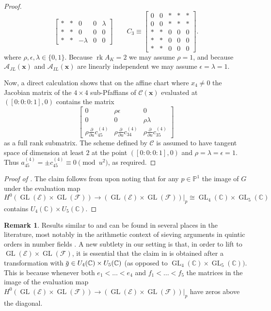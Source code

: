 \documentclass[11pt]{amsart}
\numberwithin{theorem}{section}
\numberwithin{equation}{section}
\theoremstyle{definition}\newtheorem{defn}[theorem]{Definition}
\theoremstyle{definition}\newtheorem{remark}[theorem]{Remark}
\theoremstyle{definition}\newtheorem{question}[theorem]{Question}
\theoremstyle{definition}\newtheorem{problem}[theorem]{Problem}
\newcommand{\CC}{\mathbb{C}}
\newcommand{\PP}{\mathbb{P}}
\newcommand{\cE}{\mathcal{E}}
\newcommand{\cF}{\mathcal{F}}
\newcommand{\cA}{\mathcal{A}}
\newcommand{\overbar}[1]{\mkern 1.5mu\overline{\mkern-1.5mu#1\mkern-1.5mu}\mkern 1.5mu}
\DeclareMathOperator{\rank}{rk}
\DeclareMathOperator{\GL}{GL}
\newcommand{\K}{K}
\renewcommand{\L}{L}
\begin{document}
\begin{proof}
\begin{equation*}
\begin{bmatrix}
      * & * & 0 & 0 & \lambda \\
      * & * & 0 & 0 & 0 \\
      * & * & -\lambda & 0 & 0 
  \end{bmatrix}
  \qquad
  C_3 \equiv \begin{bmatrix}
      0 & 0 & * & * & * \\
      0 & 0 & * & * & * \\
      * & * & 0 & 0 & 0 \\
      * & * & 0 & 0 & 0 \\
      * & * & 0 & 0 & 0 
  \end{bmatrix}.
\end{equation*}
where $\rho, \epsilon,\lambda \in \{0,1\}$. Because $\rank A_{\K} = 2$ we may assume $\rho = 1$, and because $\cA_{J\L}(\textbf{x})$ and $\cA_{I\L}(\textbf{x})$ are linearly independent we may assume $\epsilon = \lambda = 1$.

Now, a direct calculation shows that on the affine chart where $x_4 \neq 0$ the Jacobian matrix of the $4 \times 4$ sub-Pfaffians of ${\mathcal{C}}(\mathbf{x})$ evaluated at $([0:0:0:1], 0)$ contains the matrix 
\[
\begin{bmatrix}
    0 & \rho \epsilon & 0 \\
    0 & 0 & \rho \lambda \\
    \rho \tfrac{\partial}{\partial u} c_{45}^{(4)} & \rho\tfrac{\partial}{\partial u} c_{34}^{(4)}  & \rho \tfrac{\partial}{\partial u} c_{35}^{(4)}  
\end{bmatrix}
\]
as a full rank submatrix. The scheme defined by $\mathcal{C}$ is assumed to have tangent space of dimension at least $2$ at the point $([0:0:0:1], 0)$ and $\rho = \lambda = \epsilon = 1$. Thus $a_{45}^{(4)} = \pm c_{45}^{(4)} \equiv 0 \pmod{u^2}$, as required.
\end{proof}

\begin{proof}[Proof of ]
    The claim follows from  upon noting that for any $p \in \PP^1$ the image of $G$ under the evaluation map 
    \[
    H^0(\GL(\cE) \times \GL(\cF)) \to ( \GL(\cE) \times \GL(\cF) ) |_p \cong \GL_4(\CC) \times \GL_5(\CC)
    \]contains $U_4(\CC) \times U_5(\CC)$.
\end{proof}

\begin{remark}
  Results similar to  and  can be found in several places in the literature, most notably in the arithmetic context of sieving arguments in quintic orders in number fields \cite{B-hcl4}. A new subtlety in our setting is that, in order to lift to $\GL(\cE) \times \GL(\cF)$, it is essential that the claim in  is obtained after a transformation with $\overbar{g} \in U_4(\CC) \times U_5(\CC)$ (as opposed to $\GL_4(\CC) \times \GL_5(\CC))$. This is because whenever both $e_1 < \dots < e_4$ and $f_1 < \dots < f_5$ the matrices in the image of the evaluation map $H^0(\GL(\cE) \times \GL(\cF)) \to (\GL(\cE) \times \GL(\cF) )|_p$ have zeros above the diagonal. 
\end{remark}
\end{document}
